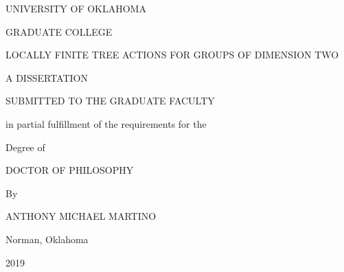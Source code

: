 \documentclass[12pt,parskip=full]{report}
\theoremstyle{plain}
\theoremstyle{definition}
\begin{document}



{%

{\singlespacing

\newpage
\thispagestyle{empty}
\begin{center}
{ %
\uppercase{UNIVERSITY OF OKLAHOMA}
\par
\vspace{0.16in}
\uppercase{GRADUATE COLLEGE}
\par
\vspace{1.2in}
\uppercase{locally finite tree actions for groups of dimension two} 
\par
\vspace{0.17in}
\par
\vspace{1.2in}
\uppercase{A dissertation}
\par
\vspace{0.17in}
\uppercase{Submitted to the graduate faculty}
\par
\vspace{0.17in}
in partial fulfillment of the requirements for the
\par
\vspace{0.17in}
Degree of
\par
\vspace{0.17in}
\uppercase{Doctor of Philosophy}
\par
\vfill
By
\par
\vspace{0.17in}
\uppercase{Anthony Michael Martino}
\par
Norman, Oklahoma
\par
2019
}
\end{center}


}}
\end{document}

